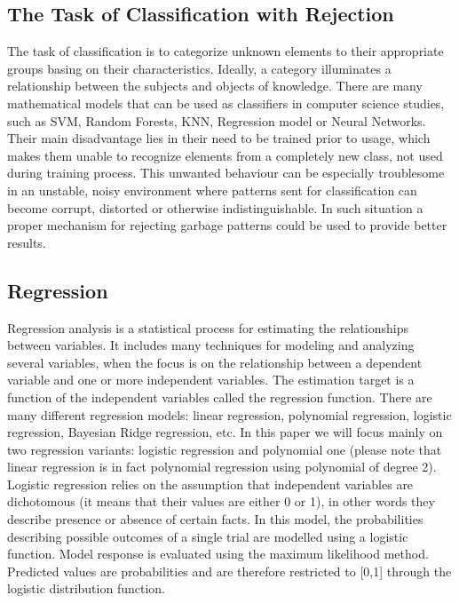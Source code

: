 \documentclass{llncs}
\begin{document}
\subsection{The Task of Classification with Rejection}
	\label{sec:Known algorithms}

The task of classification is to categorize unknown elements to their appropriate groups basing on their characteristics. Ideally, a category illuminates a relationship between the subjects and objects of knowledge. There are many mathematical models that can be used as classifiers in computer science studies, such as SVM, Random Forests, KNN, Regression model or Neural Networks. Their main disadvantage lies in their need to be trained prior to usage, which makes them unable to recognize elements from a completely new class, not used during training process. This unwanted behaviour can be especially troublesome in an unstable, noisy environment where patterns sent for classification can become corrupt, distorted or otherwise indistinguishable. In such situation a proper mechanism for rejecting garbage patterns could be used to provide better results. \\

\subsection{Regression}
Regression analysis is a statistical process for estimating the relationships between variables. It includes many techniques for modeling and analyzing several variables, when the focus is on the relationship between a dependent variable and one or more independent variables. The estimation target is a function of the independent variables called the regression function. There are many different regression models: linear regression, polynomial regression, logistic regression, Bayesian Ridge regression, etc. In this paper we will focus mainly on two regression variants: logistic regression and polynomial one (please note that linear regression is in fact polynomial regression using polynomial of degree 2). \\

Logistic regression relies on the assumption that independent variables are dichotomous (it means that their values are either 0 or 1), in other words they describe presence or absence of certain facts. In this model, the probabilities describing possible outcomes of a single trial are modelled using a logistic function. Model response is evaluated using the maximum likelihood method. Predicted values are probabilities and are therefore restricted to [0,1] through the logistic distribution function. \\ %
\end{document}
